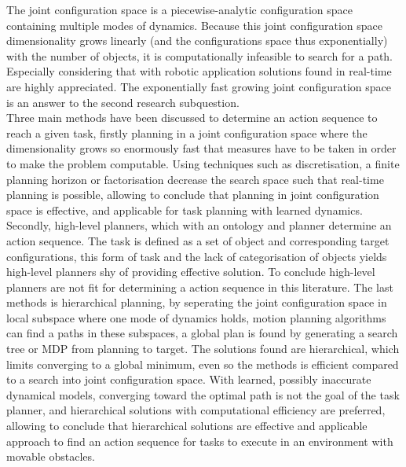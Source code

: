 The joint configuration space is a piecewise-analytic configuration space containing multiple modes of dynamics. Because this joint configuration space dimensionality grows linearly (and the configurations space thus exponentially) with the number of objects, it is computationally infeasible to search for a path. Especially considering that with robotic application  solutions found in real-time are highly appreciated. The exponentially fast growing joint configuration space is an answer to the second research subquestion. \\

Three main methods have been discussed to determine an action sequence to reach a given task, firstly planning in a joint configuration space where the dimensionality grows so enormously fast that measures have to be taken in order to make the problem computable. Using techniques such as discretisation, a finite planning horizon or factorisation decrease the search space such that real-time planning is possible, allowing to conclude that planning in joint configuration space is effective, and applicable for task planning with learned dynamics. Secondly, high-level planners, which with an ontology and planner determine an action sequence. The task is defined as a set of object and corresponding target configurations, this form of task and the lack of categorisation of objects yields high-level planners shy of providing effective solution. To conclude high-level planners are not fit for determining a action sequence in this literature. The last methods is hierarchical planning, by seperating the joint configuration space in local subspace where one mode of dynamics holds, motion planning algorithms can find a paths in these subspaces, a global plan is found by generating a search tree or \ac{MDP} from planning to target. The solutions found are hierarchical, which limits converging to a global minimum, even so the methods is efficient compared to a search into joint configuration space. With learned, possibly inaccurate dynamical models, converging toward the optimal path is not the goal of the task planner, and hierarchical solutions with computational efficiency are preferred, allowing to conclude that hierarchical solutions are effective and applicable approach to find an action sequence for tasks to execute in an environment with movable obstacles.\\ 